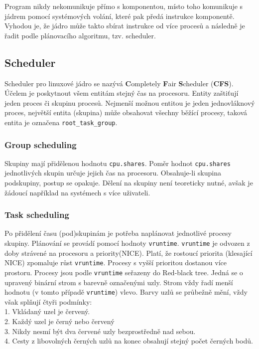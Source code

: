 \documentclass[12pt,a4paper,twoside,]{article}
\begin{document}
{Program nikdy nekomunikuje přímo s komponentou, místo toho komunikuje s jádrem pomocí systémových volání, které pak předá instrukce komponentě. Vyhodou je, že jádro může takto sbírat instrukce od více procesů a následně je řadit podle plánovacího algoritmu, tzv. scheduler.

\subsection{\textsf{Scheduler}}
Scheduler pro linuxové jádro se nazývá {\bf C}ompletely {\bf F}air {\bf S}cheduler ({\bf CFS}). Účelem je poskytnout všem entitám stejný čas na procesoru. Entity zaštiťují jeden proces či skupinu procesů. Nejmenší možnou entitou je jeden jednovláknový proces, největší entita (skupina) může obsahovat všechny běžící procesy, taková entita je označena \texttt{root\_task\_group}. 
\subsubsection{\textsf{Group scheduling}}
Skupiny mají přidělenou hodnotu \texttt{cpu.shares}. Poměr hodnot \texttt{cpu.shares} jednotlivých skupin určuje jejich čas na procesoru. Obsahuje-li skupina podskupiny, postup se opakuje. Dělení na skupiny není teoreticky nutné, avšak je žádoucí například na systémech s více uživateli.
\subsubsection{\textsf{Task scheduling}}
Po přidělení času (pod)skupinám je potřeba naplánovat jednotlivé procesy skupiny. Plánování se provádí pomocí hodnoty \texttt{vruntime}. \texttt{vruntime} je odvozen z doby strávené na procesoru a priority(NICE). Platí, že rostoucí priorita (klesající NICE) zpomaluje růst \texttt{vruntime}. Procesy s vyšší prioritou dostanou více prostoru. Procesy jsou podle \texttt{vruntime} seřazeny do Red-black tree. Jedná se o upravený binární strom s barevně označenými uzly. Strom vždy řadí menší hodnotu (v tomto případě \texttt{vruntime}) vlevo. Barvy uzlů se průbežně mění, vždy však splňují čtyři podmínky:\\
1. Vkládaný uzel je červený.\\2. Každý uzel je černý nebo červený\\3. Nikdy nesmí být dva červené uzly bezprostředně nad sebou.\\4. Cesty z libovolných černých uzlů na konec obsahují stejný počet černých bodů. \\ 

}
\end{document}
